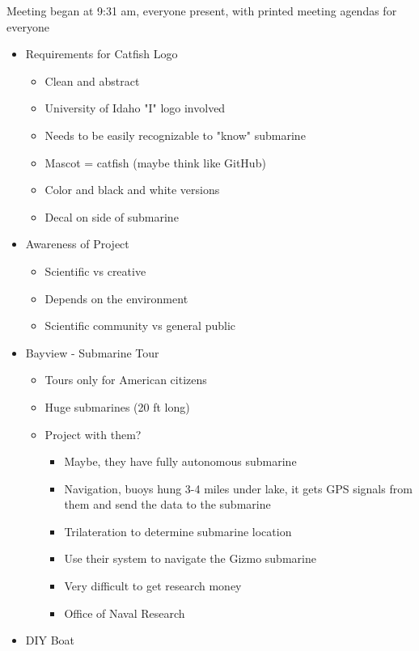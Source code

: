 \documentclass[12pt]{article}
\begin{document}
		\noindent
		Meeting began at 9:31 am, everyone present, with printed meeting agendas for everyone
		
		\noindent
		\begin{itemize}
			\item Requirements for Catfish Logo
			\begin{itemize}
				\item Clean and abstract
				\item University of Idaho "I" logo involved
				\item Needs to be easily recognizable to "know" submarine
				\item Mascot = catfish (maybe think like GitHub)
				\item Color and black and white versions
				\item Decal on side of submarine
			\end{itemize}
			\item Awareness of Project
			\begin{itemize}
				\item Scientific vs creative
				\item Depends on the environment
				\item Scientific community vs general public
			\end{itemize}
			\item Bayview - Submarine Tour
			\begin{itemize}
				\item Tours only for American citizens
				\item Huge submarines (20 ft long)
				\item Project with them?
				\begin{itemize}
					\item Maybe, they have fully autonomous submarine
					\item Navigation, buoys hung 3-4 miles under lake, it gets GPS signals from them and send the data to the submarine
					\item Trilateration to determine submarine location
					\item Use their system to navigate the Gizmo submarine
					\item Very difficult to get research money 
					\item Office of Naval Research
				\end{itemize}
			\end{itemize}
			\item DIY Boat
			\begin{itemize}

\end{itemize}
\end{itemize}
\end{document}
